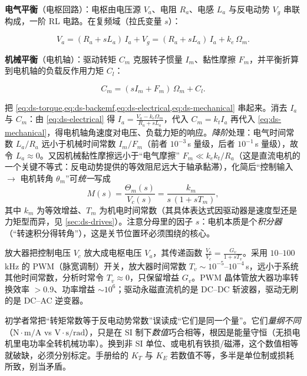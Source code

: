 \textbf{电气平衡}（电枢回路）：电枢由电压源 $V_a$、电阻 $R_a$、电感 $L_a$ 与反电动势 $V_g$ 串联构成，一阶 RL 电路。在复频域（拉氏变量 $s$）：

\begin{equation}
V_a = (R_a + sL_a)\,I_a + V_g = (R_a + sL_a)\,I_a + k_e\,\Omega_m.
\label{eq:ds-electrical}
\end{equation}

\textbf{机械平衡}（电机轴）：驱动转矩 $C_m$ 克服转子惯量 $I_m$、黏性摩擦 $F_m$，并平衡折算到电机轴的负载反作用力矩 $C_l$：

\begin{equation}
C_m = (sI_m + F_m)\,\Omega_m + C_l.
\label{eq:ds-mechanical}
\end{equation}

\begin{derivation}[从两条平衡到统一传递函数]
把 \cref{eq:ds-torque,eq:ds-backemf,eq:ds-electrical,eq:ds-mechanical} 串起来。消去 $I_a$ 与 $C_m$：由 \cref{eq:ds-electrical} 得 $I_a=\frac{V_a-k_e\Omega_m}{R_a+sL_a}$，代入 $C_m=k_tI_a$ 再代入 \cref{eq:ds-mechanical}，得电机轴角速度对电压、负载力矩的响应。\emph{降阶}处理：电气时间常数 $L_a/R_a$ 远小于机械时间常数 $I_m/F_m$（前者 $10^{-3}\,$s 量级，后者 $10^{-1}\,$s 量级），故令 $L_a\approx0$。又因机械黏性摩擦远小于“电气摩擦” $F_m\ll k_ek_t/R_a$（这是直流电机的一个关键不等式：反电动势提供的等效阻尼远大于轴承黏滞），化简后“控制输入 $\to$ 电机转角 $\theta_m$”可\emph{统一}写成
\begin{equation}
M(s)=\frac{\Theta_m(s)}{V_c(s)}=\frac{k_m}{s\,(1+sT_m)},
\label{eq:ds-Ms}
\end{equation}
其中 $k_m$ 为等效增益、$T_m$ 为机电时间常数（其具体表达式因驱动器是速度型还是力矩型而异，见 \cref{sec:ds-drives}）。注意分母里的因子 $s$：电机本质是个\emph{积分器}（“转速积分得转角”），这是关节位置环必须围绕的核心。
\end{derivation}

\begin{note}
放大器把控制电压 $V_c$ 放大成电枢电压 $V_a$，其传递函数 $\frac{V_a}{V_c}=\frac{G_v}{1+sT_v}$。采用 $10$--$100\,$kHz 的 PWM（脉宽调制）开关，放大器时间常数 $T_v\sim10^{-5}$--$10^{-4}\,$s，远小于系统其他时间常数，分析时常令 $T_v\approx0$，只保留增益 $G_v$。PWM 晶体管放大器功率转换效率 $>0.9$、功率增益 $\sim10^6$；驱动永磁直流机的是 DC--DC 斩波器，驱动无刷的是 DC--AC 逆变器。
\end{note}

\begin{pitfall}[$k_t=k_e$ 数值相等不等于量纲相同]
初学者常把“转矩常数等于反电动势常数”误读成“它们是同一个量”。它们\emph{量纲不同}（$\mathrm{N\cdot m/A}$ vs $\mathrm{V\cdot s/rad}$），只是在 SI 制下\emph{数值}巧合相等，根因是能量守恒（无损电机里电功率全转机械功率）。换到非 SI 单位、或电机有铁损/磁滞，这个数值相等就破缺，必须分别标定。手册给的 $K_T$ 与 $K_E$ 若数值不等，多半是单位制或损耗所致，别当矛盾。
\end{pitfall}

